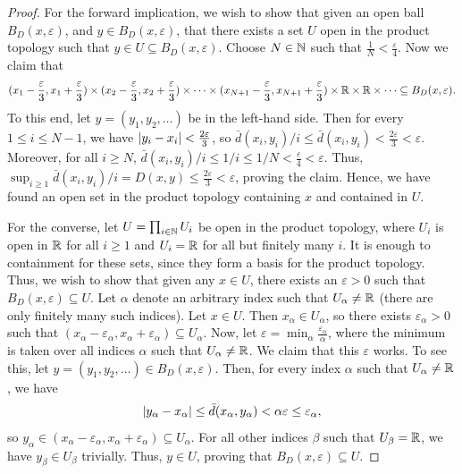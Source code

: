 \begin{proof}
    For the forward implication, we wish to show that given an open ball $B_{D}(x,\varepsilon)$, and $y \in B_{D}(x,\varepsilon)$, that there exists a set $U$ open in the product topology such that $y \in U \subseteq B_{D}(x,\varepsilon)$. Choose $N \in \mathbb{N}$ such that $\frac{1}{N} < \frac{\varepsilon}{4}$. Now we claim that
    \begin{align}
        (x_{1} - \frac{\varepsilon}{3}, x_{1} + \frac{\varepsilon}{3}) \times (x_{2} - \frac{\varepsilon}{3}, x_{2} + \frac{\varepsilon}{3}) \times \cdots \times (x_{N+1} - \frac{\varepsilon}{3}, x_{N+1} + \frac{\varepsilon}{3}) \times \mathbb{R} \times \mathbb{R} \times \cdots \subseteq B_{D}(x,\varepsilon).
    \end{align}
    To this end, let $y = (y_{1}, y_{2}, \ldots)$ be in the left-hand side. Then for every $1 \leq i \leq N-1$, we have $\left| y_{i}-x_{i} \right| < \frac{2\varepsilon}{3}$, so $\bar{d}(x_{i},y_{i})/i \leq \bar{d}(x_{i},y_{i}) < \frac{2\varepsilon}{3} < \varepsilon$. Moreover, for all $i \geq N$, $\bar{d}(x_{i},y_{i})/i \leq 1/i \leq 1/N < \frac{\varepsilon}{4} < \varepsilon$. Thus, $\sup_{i \geq 1} \bar{d}(x_{i},y_{i})/i = D(x,y) \leq \frac{2\varepsilon}{3} < \varepsilon$, proving the claim. Hence, we have found an open set in the product topology containing $x$ and contained in $U$.

    For the converse, let $U = \prod_{i \in \mathbb{N}} U_{i}$ be open in the product topology, where $U_{i}$ is open in $\mathbb{R}$ for all $i \geq 1$ and $U_{i} = \mathbb{R}$ for all but finitely many $i$. It is enough to containment for these sets, since they form a basis for the product topology. Thus, we wish to show that given any $x \in U$, there exists an $\varepsilon > 0$ such that $B_{D}(x,\varepsilon) \subseteq U$. Let $\alpha$ denote an arbitrary index such that $U_{\alpha} \neq \mathbb{R}$ (there are only finitely many such indices). Let $x \in U$. Then $x_{\alpha} \in U_{\alpha}$, so there exists $\varepsilon_{\alpha} > 0$ such that $(x_{\alpha} - \varepsilon_{\alpha}, x_{\alpha} + \varepsilon_{\alpha}) \subseteq U_{\alpha}$. Now, let $\varepsilon = \min_{\alpha} \frac{\varepsilon_{\alpha}}{\alpha}$, where the minimum is taken over all indices $\alpha$ such that $U_{\alpha} \neq \mathbb{R}$. We claim that this $\varepsilon$ works. To see this, let $y = (y_{1}, y_{2}, \ldots) \in B_{D}(x,\varepsilon)$. Then, for every index $\alpha$ such that $U_{\alpha} \neq \mathbb{R}$, we have
    \begin{align}
        \left| y_{\alpha} - x_{\alpha} \right| \leq \bar{d}(x_{\alpha},y_{\alpha}) < \alpha \varepsilon \leq \varepsilon_{\alpha},
    \end{align}
    so $y_{\alpha} \in (x_{\alpha} - \varepsilon_{\alpha}, x_{\alpha} + \varepsilon_{\alpha}) \subseteq U_{\alpha}$. For all other indices $\beta$ such that $U_{\beta} = \mathbb{R}$, we have $y_{\beta} \in U_{\beta}$ trivially. Thus, $y \in U$, proving that $B_{D}(x,\varepsilon) \subseteq U$.
\end{proof}

